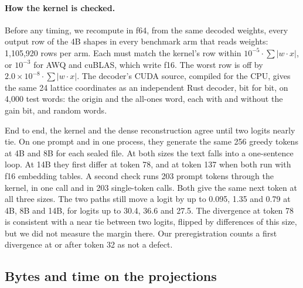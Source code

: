 \paragraph{How the kernel is checked.} Before any timing, we recompute in f64,
from the same decoded weights, every output row of the 4B shapes in every
benchmark arm that reads weights: 1{,}105{,}920 rows per arm.
Each must match the kernel's row within $10^{-5}\cdot\sum|w\cdot x|$, or
$10^{-3}$ for AWQ and cuBLAS, which write f16. The worst \Tetra{} row is off by
$2.0\times10^{-8}\cdot\sum|w\cdot x|$. The decoder's CUDA source, compiled for
the CPU, gives the same 24 lattice coordinates as an independent Rust decoder,
bit for bit, on 4{,}000 test words: the origin and the all-ones word, each
with and without the gain bit, and random words.

End to end, the kernel and the dense reconstruction agree until two logits
nearly tie. On one prompt and in one process, they generate the same 256
greedy tokens at 4B and 8B for each sealed file. At both sizes the text falls into a
one-sentence loop. At 14B they first differ at token 78, and at token 137 when
both run with f16 embedding tables. A second check runs 203 prompt tokens
through the kernel, in one call and in 203 single-token calls. Both give the
same next token at all three sizes. The two paths still move a logit by up to
0.095, 1.35 and 0.79 at 4B, 8B and 14B, for logits up to 30.4, 36.6 and 27.5.
The divergence at token 78 is consistent with a near tie between two logits,
flipped by differences of this size, but we did not measure the margin there.
Our preregistration counts a first divergence at or after token 32 as not a
defect.

\subsection{Bytes and time on the projections}
\label{sec:bench}

